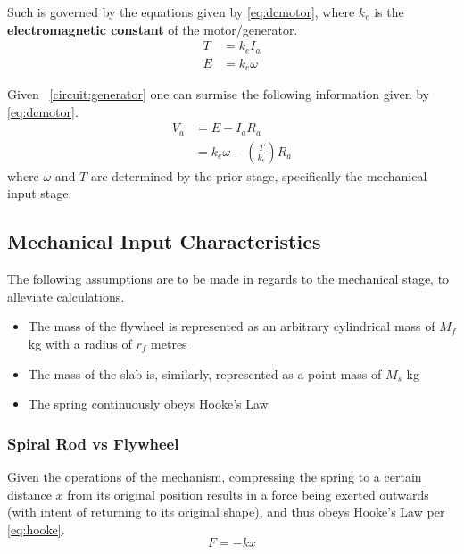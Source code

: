 \documentclass[conference]{IEEEtran}
\newcommand{\figref}[1]{\figurename~\ref{#1}}
\begin{document}
Such is governed by the equations given by \eqref{eq:dcmotor}, where $k_e$ is the \textbf{electromagnetic constant} of the motor/generator.
\begin{subequations}
    \label{eq:dcmotor}
    \begin{align}
        T &= k_e I_a
        \label{eq:dcmotor:torque}\\
        E &= k_e \omega
        \label{eq:dcmotor:emf}
    \end{align}
\end{subequations}

Given \figref{circuit:generator} one can surmise the following information given by \eqref{eq:dcmotor}.
\begin{equation}
    \label{eq:circuit}
    \begin{aligned}
        V_a &= E - I_aR_a\\
        &= k_e\omega - \left(\frac{T}{k_e}\right)R_a
    \end{aligned}
\end{equation}
where \(\omega\) and \(T\) are determined by the prior stage, specifically the mechanical input stage.

\subsection{Mechanical Input Characteristics}
The following assumptions are to be made in regards to the mechanical stage, to alleviate calculations.
\begin{itemize}
    \item The mass of the flywheel is represented as an arbitrary cylindrical mass of \(M_f\) kg with a radius of \(r_f\) metres
    \item The mass of the slab is, similarly, represented as a point mass of \(M_s\) kg
    \item The spring continuously obeys Hooke's Law
\end{itemize}

\subsubsection{Spiral Rod vs Flywheel}
Given the operations of the mechanism, compressing the spring to a certain distance \(x\) from its original position results in a force being exerted outwards (with intent of returning to its original shape), and thus obeys Hooke's Law per \eqref{eq:hooke}.
\begin{equation}
    \label{eq:hooke}
    F = -kx
\end{equation}
\end{document}

